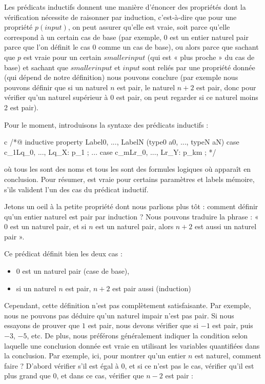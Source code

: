 Les prédicats inductifs donnent une manière d'énoncer des propriétés dont la
vérification nécessite de raisonner par induction, c'est-à-dire que pour une propriété
$p(input)$, on peut assurer qu'elle est vraie, soit parce qu'elle correspond à un
certain cas de base (par exemple, $0$ est un entier naturel pair parce que l'on
définit le cas 0 comme un cas de base), ou alors parce que sachant que $p$ est vraie
pour un certain $smaller input$ (qui est « plus proche » du cas de base) et sachant
que $smaller input$ et $input$ sont reliés par une propriété donnée (qui dépend
de notre définition) nous pouvons conclure (par exemple nous pouvons définir que
si un naturel $n$ est pair, le naturel $n+2$ est pair, donc pour vérifier qu'un
naturel supérieur à 0 est pair, on peut regarder si ce naturel moins 2 est pair).





Pour le moment, introduisons la syntaxe des prédicats inductifs :

\begin{CodeBlock}{c}
/*@
  inductive property{ Label0, ..., LabelN }(type0 a0, ..., typeN aN) {
  case c_1{Lq_0, ..., Lq_X}: p_1 ;
  ...
  case c_m{Lr_0, ..., Lr_Y}: p_km ;
  }
*/
\end{CodeBlock}


où tous les  sont des noms et tous les  sont
des formules logiques où  apparaît en conclusion. Pour résumer,
 est vraie pour certains paramètres et labels mémoire, s'ils
valident l'un des cas du prédicat inductif.


Jetons un oeil à la petite propriété dont nous parlions plus tôt : comment définir
qu'un entier naturel est pair par induction ? Nous pouvons traduire la phrase :
« 0 est un naturel pair, et si $n$ est un naturel pair, alors $n+2$ est aussi un
naturel pair ».




Ce prédicat définit bien les deux cas :


\begin{itemize}
\item $0$ est un naturel pair (case de base),
\item si un naturel $n$ est pair, $n+2$ est pair aussi (induction)
\end{itemize}



Cependant, cette définition n'est pas complètement satisfaisante. Par exemple,
nous ne pouvons pas déduire qu'un naturel impair n'est pas pair. Si nous essayons
de prouver que $1$ est pair, nous devons vérifier que si $-1$ est pair, puis $-3$,
$-5$, etc. De plus, nous préférons généralement indiquer la condition selon
laquelle une conclusion donnée est vraie en utilisant les variables quantifiées
dans la conclusion. Par exemple, ici, pour montrer qu'un entier $n$ est naturel,
comment faire ? D'abord vérifier s'il est égal à 0, et si ce n'est pas le cas,
vérifier qu'il est plus grand que 0, et dans ce cas, vérifier que $n-2$ est pair :


